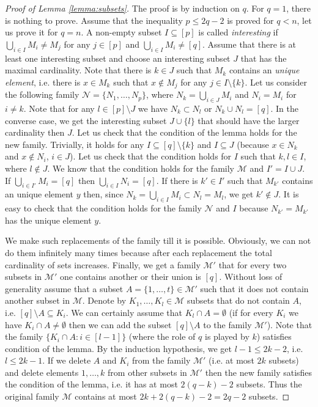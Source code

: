 \documentclass[12pt,nopagetitle]{article}
\theoremstyle{plain}
\theoremstyle{definition}
\begin{document}
\begin{proof}[Proof of Lemma \ref{lemma:subsets}]
The proof is by induction on $q$. For $q=1$, there is nothing to prove. Assume that the inequality $p\leq 2q-2$ is proved for $q< n$, let us prove it for $q=n$. A non-empty subset $I\subseteq[p]$ is called \emph{interesting} if $\bigcup_{i\in I} M_i\ne M_j$ for any $j\in [p]$ and $\bigcup_{i\in I}M_i\ne [q]$. Assume that there is at least one interesting subset and choose an interesting subset $J$ that has the maximal cardinality. Note that there is $k\in J$ such that $M_k$ contains an \emph{unique element}, i.e. there is $x\in M_k$ such that $x\not \in M_j$ for any $j\in I\setminus \{k\}$. Let us consider the following family $\mathcal{N} =\{N_1, \dots, N_p\}$, where $N_k=\bigcup_{i\in J} M_i$ and $N_i=M_i$ for $i\ne k$. Note that for any $l \in [p]\setminus J$ we have $N_k\subset N_l$ or $N_k\cup N_l=[q]$. In the converse case, we get the interesting subset $J\cup \{l\}$ that should have the larger cardinality then $J$. Let us check that the condition of the lemma holds for the new family. Trivially, it holds for any $I\subseteq [q]\setminus\{k\}$ and $I\subseteq J$ (because $x\in N_k$ and $x\not \in N_i$, $i\in J$). Let us check that the condition holds for $I$ such that $k, l\in I$, where $l\not \in J$. We know that the condition holds for the family $\mathcal{M}$ and $I'=I\cup J$. If $\bigcup_{i\in I'} M_i=[q]$ then $\bigcup_{i\in I}N_i=[q]$. If there is $k'\in I'$ such that $M_{k'}$ contains an unique element $y$ then, since $N_k=\bigcup_{i\in I}M_i\subset N_l=M_l$, we get $k'\not\in J$. It is easy to check that the condition holds for the family $\mathcal N$ and $I$ because $N_{k'}=M_{k'}$ has the unique element $y$.

We make such replacements of the family till it is possible. Obviously, we can not do them infinitely many times because after each replacement the total cardinality of sets increases. Finally, we get a family $\mathcal{M'}$ that for every two subsets in $\mathcal{M}'$ one contains another or their union is $[q]$. Without loss of generality assume that a subset $A=\{1,\dots, t\}\in \mathcal{M}'$ such that it does not contain another subset in $\mathcal{M}$. Denote by $K_1, \dots, K_l\in \mathcal{M}$ subsets that do not contain $A$, i.e. $[q]\setminus A\subseteq K_i$. We can certainly assume that $K_l\cap A=\emptyset$ (if for every $K_i$ we have $K_i\cap A\ne \emptyset$ then we can add the subset $[q]\setminus A$ to the family $\mathcal M'$). Note that the family $\{K_i\cap A: i\in[l-1]\}$ (where the role of $q$ is played by $k$) satisfies condition of the lemma. By the induction hypothesis, we get $l-1\leqslant 2k-2$, i.e. $l\leqslant 2k-1$. If we delete $A$ and $K_i$ from the family $\mathcal M'$ (i.e. at most $2k$ subsets) and delete elements $1,\dots , k$ from other subsets in $\mathcal{M}'$ then the new family satisfies the condition of the lemma, i.e. it has at most $2(q-k)-2$ subsets. Thus the original family $\mathcal{M}$ contains at most $2k+2(q-k)-2=2q-2$ subsets.
\end{proof}
\end{document}
